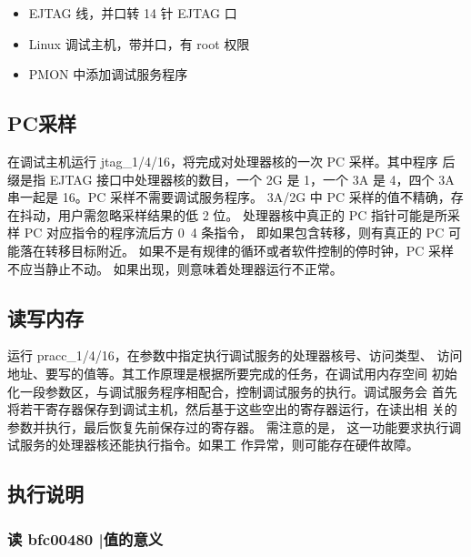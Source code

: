 \begin{itemize}
  \item EJTAG 线，并口转 14 针 EJTAG 口
  \item Linux 调试主机，带并口，有 root 权限
  \item PMON 中添加调试服务程序
\end{itemize}

\subsection{PC采样}

在调试主机运行 jtag\_1/4/16，将完成对处理器核的一次 PC 采样。其中程序 后缀是指
EJTAG 接口中处理器核的数目，一个 2G 是 1，一个 3A 是 4，四个 3A 串一起是 16。PC
采样不需要调试服务程序。 3A/2G 中 PC
采样的值不精确，存在抖动，用户需忽略采样结果的低 2 位。 处理器核中真正的 PC
指针可能是所采样 PC 对应指令的程序流后方 0~4 条指令，
即如果包含转移，则有真正的 PC 可能落在转移目标附近。
如果不是有规律的循环或者软件控制的停时钟，PC 采样不应当静止不动。
如果出现，则意味着处理器运行不正常。

\subsection{读写内存}

运行 pracc\_1/4/16，在参数中指定执行调试服务的处理器核号、访问类型、
访问地址、要写的值等。其工作原理是根据所要完成的任务，在调试用内存空间
初始化一段参数区，与调试服务程序相配合，控制调试服务的执行。调试服务会
首先将若干寄存器保存到调试主机，然后基于这些空出的寄存器运行，在读出相
关的参数并执行，最后恢复先前保存过的寄存器。 需注意的是，
这一功能要求执行调试服务的处理器核还能执行指令。如果工
作异常，则可能存在硬件故障。

\subsection{执行说明}

\subsubsection*{读 bfc00480 |值的意义}

